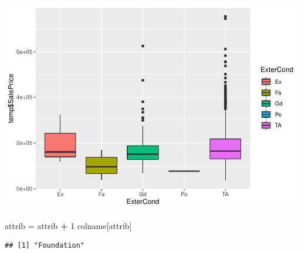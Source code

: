 \documentclass[]{article}
\newenvironment{Shaded}{\begin{snugshade}}{\end{snugshade}}
\newcommand{\DecValTok}[1]{\textcolor[rgb]{0.00,0.00,0.81}{#1}}
\newcommand{\StringTok}[1]{\textcolor[rgb]{0.31,0.60,0.02}{#1}}
\newcommand{\OperatorTok}[1]{\textcolor[rgb]{0.81,0.36,0.00}{\textbf{#1}}}
\newcommand{\NormalTok}[1]{#1}
\begin{document}
\includegraphics{EDA_files/figure-latex/unnamed-chunk-51-1.pdf}

\begin{Shaded}
\begin{Highlighting}[]
\NormalTok{attrib =}\StringTok{ }\NormalTok{attrib }\OperatorTok{+}\StringTok{ }\DecValTok{1}
\NormalTok{colname[attrib]}
\end{Highlighting}
\end{Shaded}

\begin{verbatim}
## [1] "Foundation"
\end{verbatim}
\end{document}
